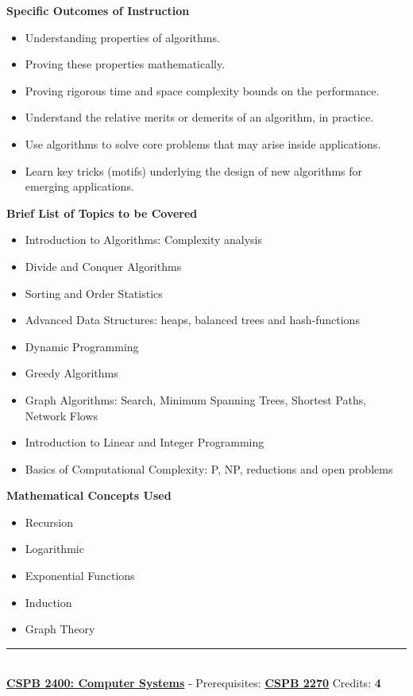 \documentclass{article}
\newcommand{\horizontalline}{\noindent \rule{\textwidth}{0.5pt} \\}
\begin{document}
\noindent \textbf{Specific Outcomes of Instruction}
\begin{itemize}
    \item Understanding properties of algorithms.
    \item Proving these properties mathematically.
    \item Proving rigorous time and space complexity bounds on the performance.
    \item Understand the relative merits or demerits of an algorithm, in practice.
    \item Use algorithms to solve core problems that may arise inside applications.
    \item Learn key tricks (motifs) underlying the design of new algorithms for emerging applications.
\end{itemize}

\noindent \textbf{Brief List of Topics to be Covered}
\begin{itemize}
    \item Introduction to Algorithms: Complexity analysis
    \item Divide and Conquer Algorithms
    \item Sorting and Order Statistics
    \item Advanced Data Structures: heaps, balanced trees and hash-functions
    \item Dynamic Programming
    \item Greedy Algorithms
    \item Graph Algorithms: Search, Minimum Spanning Trees, Shortest Paths, Network Flows
    \item Introduction to Linear and Integer Programming
    \item Basics of Computational Complexity: P, NP, reductions and open problems
\end{itemize}

\noindent \textbf{Mathematical Concepts Used}
\begin{itemize}
    \item Recursion
    \item Logarithmic
    \item Exponential Functions
    \item Induction
    \item Graph Theory
\end{itemize}
\horizontalline
\noindent \href{https://www.colorado.edu/program/cspb/cspb-2400-computer-systems}{\textbf{CSPB 2400: Computer Systems}} - Prerequisites: \href{https://www.colorado.edu/program/cspb/cspb-2270-computer-science-2-data-structures}{\textbf{CSPB 2270}} Credits: \textbf{4} \\
\end{document}
